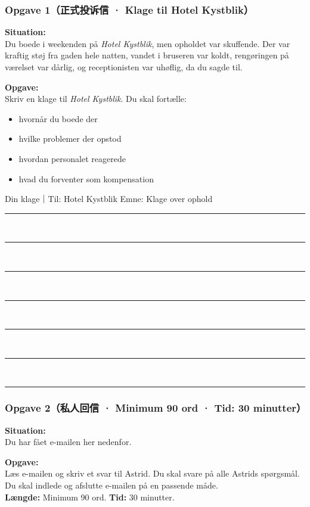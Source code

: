 \subsubsection*{Opgave 1（正式投诉信 · Klage til Hotel Kystblik）}

\textbf{Situation:}\\
Du boede i weekenden på \textit{Hotel Kystblik}, men opholdet var skuffende. Der var kraftig støj fra gaden hele natten, vandet i bruseren var koldt, rengøringen på værelset var dårlig, og receptionisten var uhøflig, da du sagde til.

\vspace{0.3em}
\textbf{Opgave:}\\
Skriv en klage til \textit{Hotel Kystblik}. Du skal fortælle:
\begin{itemize}
  \item hvornår du boede der
  \item hvilke problemer der opstod
  \item hvordan personalet reagerede
  \item hvad du forventer som kompensation
\end{itemize}

\begin{emailbox}{Din klage｜Til: Hotel Kystblik \qquad Emne: Klage over ophold}
\vspace{0.3em}
\rule{\linewidth}{0.4pt}\\[0.55em]
\rule{\linewidth}{0.4pt}\\[0.55em]
\rule{\linewidth}{0.4pt}\\[0.55em]
\rule{\linewidth}{0.4pt}\\[0.55em]
\rule{\linewidth}{0.4pt}\\[0.55em]
\rule{\linewidth}{0.4pt}\\[0.55em]
\rule{\linewidth}{0.4pt}
\end{emailbox}

\clearpage
\subsubsection*{Opgave 2（私人回信 · Minimum 90 ord · Tid: 30 minutter）}

\textbf{Situation:}\\
Du har fået e-mailen her nedenfor.

\vspace{0.3em}
\textbf{Opgave:}\\
Læs e-mailen og skriv et svar til Astrid. Du skal svare på alle Astrids spørgsmål. Du skal indlede og afslutte e-mailen på en passende måde.\\
\textbf{Længde:} Minimum 90 ord. \qquad \textbf{Tid:} 30 minutter.

